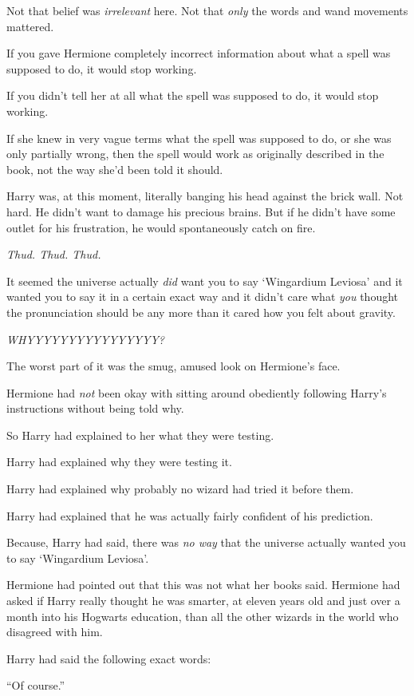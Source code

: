 Not that belief was \emph{irrelevant} here. Not that \emph{only} the words and wand movements mattered.

If you gave Hermione completely incorrect information about what a spell was supposed to do, it would stop working.

If you didn't tell her at all what the spell was supposed to do, it would stop working.

If she knew in very vague terms what the spell was supposed to do, or she was only partially wrong, then the spell would work as originally described in the book, not the way she'd been told it should.

Harry was, at this moment, literally banging his head against the brick wall. Not hard. He didn't want to damage his precious brains. But if he didn't have some outlet for his frustration, he would spontaneously catch on fire.

\emph{Thud. Thud. Thud.}

It seemed the universe actually \emph{did} want you to say `Wingardium Leviosa' and it wanted you to say it in a certain exact way and it didn't care what \emph{you} thought the pronunciation should be any more than it cared how you felt about gravity.

\emph{WHYYYYYYYYYYYYYYYY?}

The worst part of it was the smug, amused look on Hermione's face.

Hermione had \emph{not} been okay with sitting around obediently following Harry's instructions without being told why.

So Harry had explained to her what they were testing.

Harry had explained why they were testing it.

Harry had explained why probably no wizard had tried it before them.

Harry had explained that he was actually fairly confident of his prediction.

Because, Harry had said, there was \emph{no way} that the universe actually wanted you to say `Wingardium Leviosa'.

Hermione had pointed out that this was not what her books said. Hermione had asked if Harry really thought he was smarter, at eleven years old and just over a month into his Hogwarts education, than all the other wizards in the world who disagreed with him.

Harry had said the following exact words:

``Of course.''

